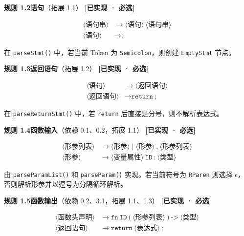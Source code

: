 \documentclass[12pt,a4paper]{ctexart}
\begin{document}
\textbf{规则 1.2\quad 语句}（拓展 1.1） \hfill \textcolor{green!60!black}{\textbf{[已实现 · 必选]}}

\begin{align}
\langle\text{语句串}\rangle &\rightarrow \langle\text{语句}\rangle \ \langle\text{语句串}\rangle \\
\langle\text{语句}\rangle &\rightarrow \texttt{;}
\end{align}

在 \texttt{parseStmt()} 中，若当前 Token 为 \texttt{Semicolon}，则创建 \texttt{EmptyStmt} 节点。

\textbf{规则 1.3\quad 返回语句}（拓展 1.2） \hfill \textcolor{green!60!black}{\textbf{[已实现 · 必选]}}

\begin{align}
\langle\text{语句}\rangle &\rightarrow \langle\text{返回语句}\rangle \\
\langle\text{返回语句}\rangle &\rightarrow \texttt{return} \ \texttt{;}
\end{align}

在 \texttt{parseReturnStmt()} 中，若 \texttt{return} 后直接是分号，则不解析表达式。

\textbf{规则 1.4\quad 函数输入}（依赖 0.1、0.2，拓展 1.1） \hfill \textcolor{green!60!black}{\textbf{[已实现 · 必选]}}

\begin{align}
\langle\text{形参列表}\rangle &\rightarrow \langle\text{形参}\rangle \mid \langle\text{形参}\rangle \ \texttt{,} \ \langle\text{形参列表}\rangle \\
\langle\text{形参}\rangle &\rightarrow \langle\text{变量属性}\rangle \ \texttt{ID} \ \texttt{:} \ \langle\text{类型}\rangle
\end{align}

由 \texttt{parseParamList()} 和 \texttt{parseParam()} 实现。若当前符号为 \texttt{RParen} 则选择 $\epsilon$，否则解析形参并以逗号为分隔循环解析。

\textbf{规则 1.5\quad 函数输出}（依赖 0.2、3.1，拓展 1.1、1.3） \hfill \textcolor{green!60!black}{\textbf{[已实现 · 必选]}}

\begin{align}
\langle\text{函数头声明}\rangle &\rightarrow \texttt{fn} \ \texttt{ID} \ \texttt{(} \ \langle\text{形参列表}\rangle \ \texttt{)} \ \texttt{->} \ \langle\text{类型}\rangle \\
\langle\text{返回语句}\rangle &\rightarrow \texttt{return} \ \langle\text{表达式}\rangle \ \texttt{;}
\end{align}
\end{document}
